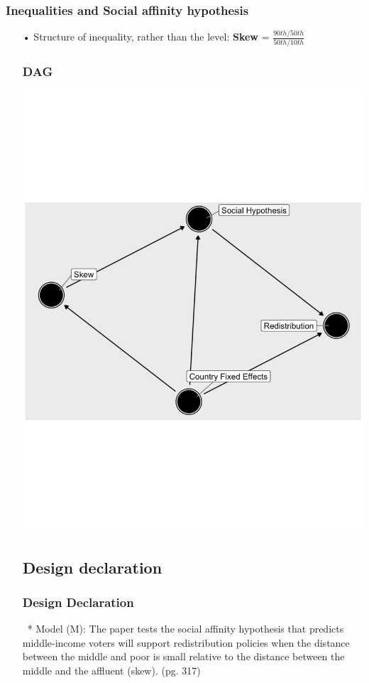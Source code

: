 \documentclass{beamer}
\begin{document}
\begin{frame}
\frametitle{Inequalities and Social affinity hypothesis}
\begin{itemize}
\item[•] Structure of inequality, rather than the level: 
\textbf{Skew} = $\frac{90th/50th}{50th/10th}$ 
\medskip

\begin{center}
\begin{frame}
\frametitle{DAG}
\includegraphics[scale=0.5]{dags}
\end{frame}
\end{center}
\begin{frame}
\subsection{Design declaration} 
\frametitle{Design Declaration}\
* Model (M): The paper tests the social affinity hypothesis that predicts middle-income voters will support redistribution policies when the distance between the middle and poor is small relative to the distance between the middle and the affluent (skew). (pg. 317)


\end{frame}
\end{itemize}
\end{frame}
\end{document}
